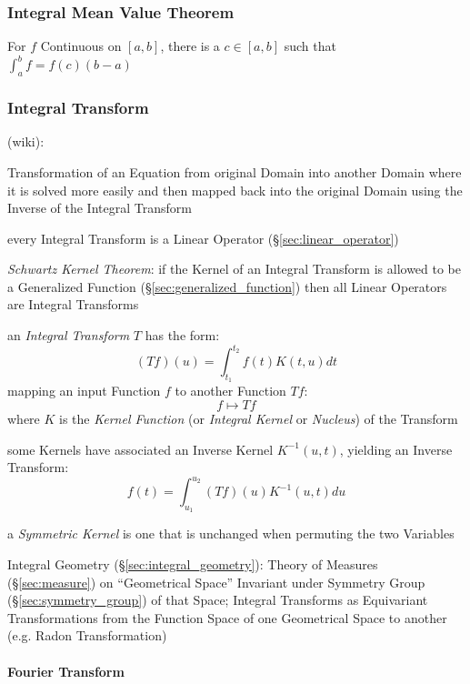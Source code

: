 \subsubsection{Integral Mean Value Theorem}
\label{sec:integral_mean_value}

For $f$ Continuous on $[a,b]$, there is a $c \in [a,b]$ such that
$\int_a^b f = f(c)(b - a)$



\subsubsection{Integral Transform}\label{sec:integral_transform}

(wiki):

Transformation of an Equation from original Domain into another Domain where it
is solved more easily and then mapped back into the original Domain using the
Inverse of the Integral Transform

every Integral Transform is a Linear Operator (\S\ref{sec:linear_operator})

\emph{Schwartz Kernel Theorem}: if the Kernel of an Integral Transform is
allowed to be a Generalized Function (\S\ref{sec:generalized_function}) then
all Linear Operators are Integral Transforms

an \emph{Integral Transform} $T$ has the form:
\[
  (T f)(u) = \int_{t_1}^{t_2} f(t) K(t,u) dt
\]
mapping an input Function $f$ to another Function $T f$:
\[
  f \mapsto T f
\]
where $K$ is the \emph{Kernel Function} (or \emph{Integral Kernel} or
\emph{Nucleus}) of the Transform

some Kernels have associated an Inverse Kernel $K^{-1}(u,t)$, yielding an
Inverse Transform:
\[
  f(t) = \int_{u_1}^{u_2} (T f)(u) K^{-1}(u,t) du
\]

a \emph{Symmetric Kernel} is one that is unchanged when permuting the two
Variables

\fist Integral Geometry (\S\ref{sec:integral_geometry}): Theory of Measures
(\S\ref{sec:measure}) on ``Geometrical Space'' Invariant under Symmetry Group
(\S\ref{sec:symmetry_group}) of that Space; Integral Transforms as Equivariant
Transformations from the Function Space of one Geometrical Space to another
(e.g. Radon Transformation)



\paragraph{Fourier Transform}\label{sec:fourier_transform}\hfill

